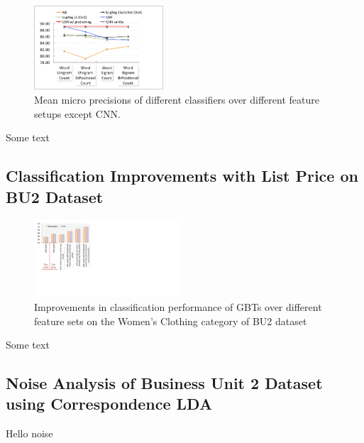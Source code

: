 \begin{figure}
\centering
\includegraphics[width=0.43\textwidth]{images/BU1-mean-micro-precision}
\caption{Mean micro precisions of different classifiers over different feature setups except CNN.}
\label{Figure_BU1-predictions-feature-averages}
\end{figure}
Some text


\subsection{Classification Improvements with List Price on BU2 Dataset}
\label{Subsect:BU2-classification-improve-list-price}

\begin{figure}
	\centering
	\includegraphics[width=0.48\textwidth]{images/BU2-gbt-feature-improvements}
	\caption{Improvements in classification performance of GBTs over different feature sets on the Women's Clothing category of BU2 dataset}
	\label{Figure_BU2-gbt-feature-improvements}
\end{figure}
Some text

\subsection{Noise Analysis of Business Unit 2 Dataset using Correspondence LDA}
\label{Subsect:BU2-noise-analysis}

Hello noise